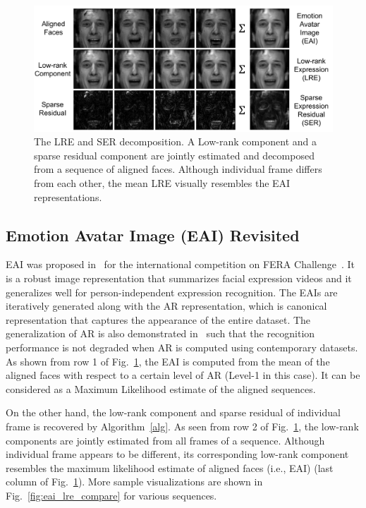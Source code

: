 \documentclass[journal]{IEEEtran}
\begin{document}
\begin{figure}[htbp]
	\centering
		\includegraphics[width=\columnwidth]{pics/low_rank_sparse}
	\caption{The LRE and SER decomposition. A Low-rank component and a sparse residual component are jointly estimated and decomposed from a sequence of aligned faces. Although individual frame differs from each other, the mean LRE visually resembles the EAI representations.}
	\label{fig:low_rank_sparse}
\end{figure}


\subsection{Emotion Avatar Image (EAI) Revisited\label{sec:eai}}

EAI was proposed in~\cite{Yang_SMCB12} for the international competition on FERA Challenge~\cite{FERA11}. It is a robust image representation that summarizes facial expression videos and it generalizes well for person-independent expression recognition. The EAIs are iteratively generated along with the AR representation, which is canonical representation that captures the appearance of the entire dataset. The generalization of AR is also demonstrated in~\cite{Yang_SMCB12} such that the recognition performance is not degraded when AR is computed using contemporary datasets. As shown from row 1 of Fig.~\ref{fig:low_rank_sparse}, the EAI is computed from the mean of the aligned faces with respect to a certain level of AR (Level-1 in this case). It can be considered as a Maximum Likelihood estimate of the aligned sequences. 

On the other hand, the low-rank component and sparse residual of individual frame is recovered by Algorithm~\ref{alg}. As seen from row 2 of Fig.~\ref{fig:low_rank_sparse}, the low-rank components are jointly estimated from all frames of a sequence. Although individual frame appears to be different, its corresponding low-rank component resembles the maximum likelihood estimate of aligned faces (i.e., EAI) (last column of Fig.~\ref{fig:low_rank_sparse}). More sample visualizations are shown in Fig.~\ref{fig:eai_lre_compare} for various sequences. 
\end{document}
